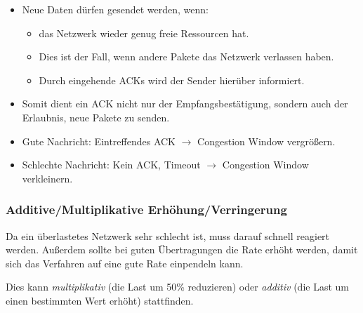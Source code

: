 \documentclass[a4paper, 11pt, accentcolor = tud3b]{tudreport}
\begin{document}
                    \begin{itemize}
                    	\item Neue Daten dürfen gesendet werden, wenn:
	                    	\begin{itemize}
	                    		\item das Netzwerk wieder genug freie Ressourcen hat.
	                    		\item Dies ist der Fall, wenn andere Pakete das Netzwerk verlassen haben.
	                    		\item Durch eingehende ACKs wird der Sender hierüber informiert.
	                    	\end{itemize}
	                    \item Somit dient ein ACK nicht nur der Empfangsbestätigung, sondern auch der Erlaubnis, neue Pakete zu senden.
	                    \item Gute Nachricht: Eintreffendes ACK \( \rightarrow \) Congestion Window vergrößern.
	                    \item Schlechte Nachricht: Kein ACK, Timeout \( \rightarrow \) Congestion Window verkleinern.
                    \end{itemize}

                \subsubsection{Additive/Multiplikative Erhöhung/Verringerung}
                    Da ein überlastetes Netzwerk sehr schlecht ist, muss darauf schnell reagiert werden. Außerdem sollte bei guten Übertragungen die Rate erhöht werden, damit sich das Verfahren auf eine gute Rate einpendeln kann.
                    
                    Dies kann \textit{multiplikativ} (die Last um 50\% reduzieren) oder \textit{additiv} (die Last um einen bestimmten Wert erhöht) stattfinden.
                    
\end{document}
